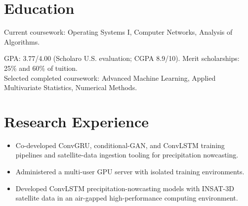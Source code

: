 
\titlespacing{\section}{0pt}{8pt}{3pt}

\resumeheader
\section{Education}
Current coursework: Operating Systems I, Computer Networks, Analysis of Algorithms.\par
\vspace{3pt}
GPA: 3.77/4.00 (Scholaro U.S. evaluation; CGPA 8.9/10). Merit scholarships: 25\% and 60\% of tuition.\\
Selected completed coursework: Advanced Machine Learning, Applied Multivariate Statistics, Numerical Methods.
\section{Research Experience}
\begin{itemize}
  \item Co-developed ConvGRU, conditional-GAN, and ConvLSTM training pipelines and satellite-data ingestion tooling for precipitation nowcasting.
  \item Administered a multi-user GPU server with isolated training environments.
\end{itemize}
\begin{itemize}
  \item Developed ConvLSTM precipitation-nowcasting models with INSAT-3D satellite data in an air-gapped high-performance computing environment.
\end{itemize}
